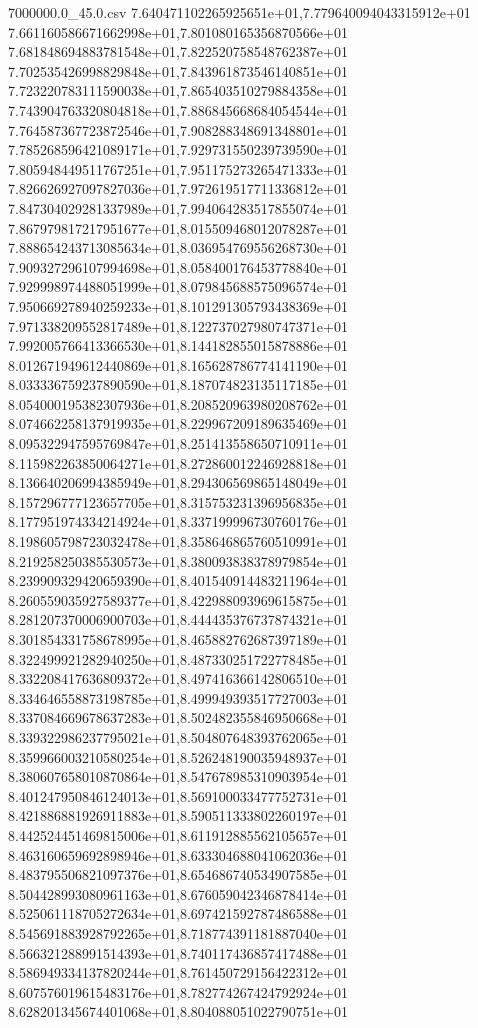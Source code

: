 \begin{filecontents*}{7000000.0_45.0.csv}
7.640471102265925651e+01,7.779640094043315912e+01
7.661160586671662998e+01,7.801080165356870566e+01
7.681848694883781548e+01,7.822520758548762387e+01
7.702535426998829848e+01,7.843961873546140851e+01
7.723220783111590038e+01,7.865403510279884358e+01
7.743904763320804818e+01,7.886845668684054544e+01
7.764587367723872546e+01,7.908288348691348801e+01
7.785268596421089171e+01,7.929731550239739590e+01
7.805948449511767251e+01,7.951175273265471333e+01
7.826626927097827036e+01,7.972619517711336812e+01
7.847304029281337989e+01,7.994064283517855074e+01
7.867979817217951677e+01,8.015509468012078287e+01
7.888654243713085634e+01,8.036954769556268730e+01
7.909327296107994698e+01,8.058400176453778840e+01
7.929998974488051999e+01,8.079845688575096574e+01
7.950669278940259233e+01,8.101291305793438369e+01
7.971338209552817489e+01,8.122737027980747371e+01
7.992005766413366530e+01,8.144182855015878886e+01
8.012671949612440869e+01,8.165628786774141190e+01
8.033336759237890590e+01,8.187074823135117185e+01
8.054000195382307936e+01,8.208520963980208762e+01
8.074662258137919935e+01,8.229967209189635469e+01
8.095322947595769847e+01,8.251413558650710911e+01
8.115982263850064271e+01,8.272860012246928818e+01
8.136640206994385949e+01,8.294306569865148049e+01
8.157296777123657705e+01,8.315753231396956835e+01
8.177951974334214924e+01,8.337199996730760176e+01
8.198605798723032478e+01,8.358646865760510991e+01
8.219258250385530573e+01,8.380093838378979854e+01
8.239909329420659390e+01,8.401540914483211964e+01
8.260559035927589377e+01,8.422988093969615875e+01
8.281207370006900703e+01,8.444435376737874321e+01
8.301854331758678995e+01,8.465882762687397189e+01
8.322499921282940250e+01,8.487330251722778485e+01
8.332208417636809372e+01,8.497416366142806510e+01
8.334646558873198785e+01,8.499949393517727003e+01
8.337084669678637283e+01,8.502482355846950668e+01
8.339322986237795021e+01,8.504807648393762065e+01
8.359966003210580254e+01,8.526248190035948937e+01
8.380607658010870864e+01,8.547678985310903954e+01
8.401247950846124013e+01,8.569100033477752731e+01
8.421886881926911883e+01,8.590511333802260197e+01
8.442524451469815006e+01,8.611912885562105657e+01
8.463160659692898946e+01,8.633304688041062036e+01
8.483795506821097376e+01,8.654686740534907585e+01
8.504428993080961163e+01,8.676059042346878414e+01
8.525061118705272634e+01,8.697421592787486588e+01
8.545691883928792265e+01,8.718774391181887040e+01
8.566321288991514393e+01,8.740117436857417488e+01
8.586949334137820244e+01,8.761450729156422312e+01
8.607576019615483176e+01,8.782774267424792924e+01
8.628201345674401068e+01,8.804088051022790751e+01

\end{filecontents*}
